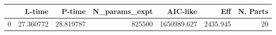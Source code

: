\begin{tabular}{lrrrrrr}
\toprule
{} &     L-time &     P-time &  N\_params\_expt &     AIC-like &       Eff &  N. Parts \\
\midrule
0 &  27.360772 &  28.819787 &         825500 &  1650989.627 &  2435.945 &        20 \\
\bottomrule
\end{tabular}
